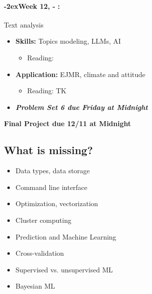 \documentclass[11pt]{article}
\newcommand{\week}[1]{%
  \paragraph*{\kern-2ex\quad #1, \AdvanceDate[1]\syldate{\today} - \AdvanceDate[2]\syldate{\today}:}%
  \ifdim\wd1=\wd\MONDAY
    \AdvanceDate[7]
  \else
    \AdvanceDate[7]
  \fi%
}
\begin{document}
\week{Week 12} Text analysis
\begin{itemize}
  \item \textbf{Skills:} Topics modeling, LLMs, AI
  \begin{itemize}
    \item Reading: \cite{ash2023textalgorithms}
  \end{itemize}
  \item \textbf{Application:} EJMR, climate and attitude
  \begin{itemize}
    \item Reading: TK
  \end{itemize}
  \item \textit{\textbf{Problem Set 6 due Friday at Midnight}}
\end{itemize}

\textbf{Final Project due 12/11 at Midnight}

\subsection*{What is missing?}

\begin{itemize}
  \item Data types, data storage
  \item Command line interface
  \item Optimization, vectorization
  \item Cluster computing
  \item Prediction and Machine Learning
  \item Cross-validation
  \item Supervised vs. unsupervised ML
  \item Bayesian ML
\end{itemize}

\newpage



\end{document}
